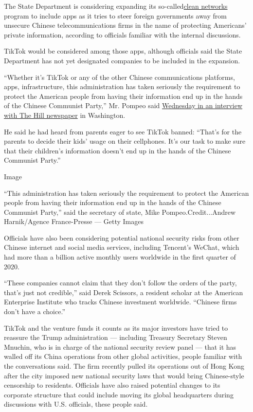 The State Department is considering expanding its
so-called\href{https://www.state.gov/the-tide-is-turning-toward-trusted-5g-vendors/}{clean
networks} program to include apps as it tries to steer foreign
governments away from unsecure Chinese telecommunications firms in the
name of protecting Americans' private information, according to
officials familiar with the internal discussions.

TikTok would be considered among those apps, although officials said the
State Department has not yet designated companies to be included in the
expansion.

``Whether it's TikTok or any of the other Chinese communications
platforms, apps, infrastructure, this administration has taken seriously
the requirement to protect the American people from having their
information end up in the hands of the Chinese Communist Party,'' Mr.
Pompeo said
\href{https://www.state.gov/secretary-michael-r-pompeo-with-bob-cusack-editor-in-chief-of-the-hill/}{Wednesday
in an interview with The Hill newspaper} in Washington.

He said he had heard from parents eager to see TikTok banned: ``That's
for the parents to decide their kids' usage on their cellphones. It's
our task to make sure that their children's information doesn't end up
in the hands of the Chinese Communist Party.''

Image

``This administration has taken seriously the requirement to protect the
American people from having their information end up in the hands of the
Chinese Communist Party,'' said the secretary of state, Mike
Pompeo.Credit...Andrew Harnik/Agence France-Presse --- Getty Images

Officials have also been considering potential national security risks
from other Chinese internet and social media services, including
Tencent's WeChat, which had more than a billion active monthly users
worldwide in the first quarter of 2020.

``These companies cannot claim that they don't follow the orders of the
party, that's just not credible,'' said Derek Scissors, a resident
scholar at the American Enterprise Institute who tracks Chinese
investment worldwide. ``Chinese firms don't have a choice.''

TikTok and the venture funds it counts as its major investors have tried
to reassure the Trump administration --- including Treasury Secretary
Steven Mnuchin, who is in charge of the national security review panel
--- that it has walled off its China operations from other global
activities, people familiar with the conversations said. The firm
recently pulled its operations out of Hong Kong after the city imposed
new national security laws that would bring Chinese-style censorship to
residents. Officials have also raised potential changes to its corporate
structure that could include moving its global headquarters during
discussions with U.S. officials, these people said.

